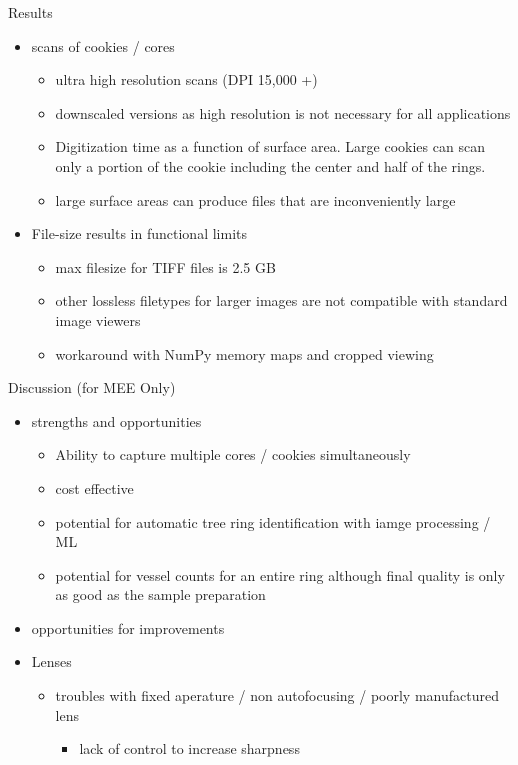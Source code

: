 \documentclass{article}
\begin{document}
\begin{outline}[itemize]
\item Results
	\begin{itemize}
	\item scans of cookies / cores
		\begin{itemize}
		\item ultra high resolution scans (DPI 15,000 +)
		\item downscaled versions as high resolution is not necessary for all applications
		\item Digitization time as a function of surface area. Large cookies can scan only a portion of the cookie including the center and half of the rings.
		\item large surface areas can produce files that are inconveniently large
		\end{itemize}
	\item File-size results in functional limits 
		\begin{itemize}
		\item max filesize for TIFF files is 2.5 GB
		\item other lossless filetypes for larger images are not compatible with standard image viewers
		\item workaround with NumPy memory maps and cropped viewing 
		\end{itemize}
	\end{itemize}
\item Discussion (for MEE Only)
	\begin{itemize}
	\item strengths and opportunities
		\begin{itemize}
		\item  Ability to capture multiple cores / cookies simultaneously
		\item cost effective
		\item potential for automatic tree ring identification with iamge processing / ML 
		\item potential for vessel counts for an entire ring 
		\subitem although final quality is only as good as the sample preparation
		\end{itemize}
	\item opportunities for improvements
		\item Lenses
			\begin{itemize}
			\item troubles with fixed aperature / non autofocusing / poorly manufactured lens
				\begin{itemize}
				\item lack of control to increase sharpness

\end{itemize}
\end{itemize}
\end{itemize}
\end{outline}
\end{document}
